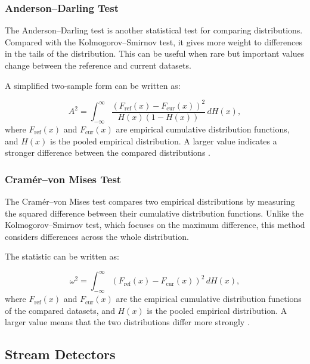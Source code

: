 \subsubsection{Anderson--Darling Test}

The Anderson--Darling test is another statistical test for comparing distributions. Compared with the Kolmogorov--Smirnov test, it gives more weight to differences in the tails of the distribution. This can be useful when rare but important values change between the reference and current datasets.

A simplified two-sample form can be written as:

\begin{equation}
A^2 = \int_{-\infty}^{\infty}
\frac{\left(F_{\mathrm{ref}}(x) - F_{\mathrm{cur}}(x)\right)^2}
{H(x)(1-H(x))} \, dH(x),
\end{equation}
where $F_{\mathrm{ref}}(x)$ and $F_{\mathrm{cur}}(x)$ are empirical cumulative distribution functions, and $H(x)$ is the pooled empirical distribution. A larger value indicates a stronger difference between the compared distributions \cite{SciPyDocumentation}.

\subsubsection{Cramér--von Mises Test}

The Cramér--von Mises test compares two empirical distributions by measuring the squared difference between their cumulative distribution functions. Unlike the Kolmogorov--Smirnov test, which focuses on the maximum difference, this method considers differences across the whole distribution.

The statistic can be written as:

\begin{equation}
\omega^2 = \int_{-\infty}^{\infty}
\left(F_{\mathrm{ref}}(x) - F_{\mathrm{cur}}(x)\right)^2 \, dH(x),
\end{equation}
where $F_{\mathrm{ref}}(x)$ and $F_{\mathrm{cur}}(x)$ are the empirical cumulative distribution functions of the compared datasets, and $H(x)$ is the pooled empirical distribution. A larger value means that the two distributions differ more strongly \cite{SciPyDocumentation}.

\subsection{Stream Detectors}

